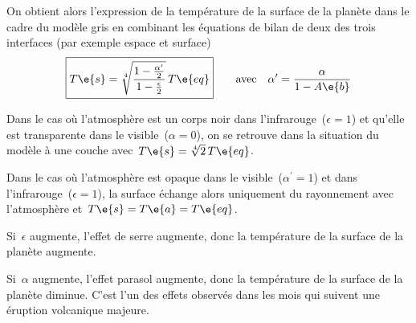 \sk
On obtient alors l'expression de la température de la surface de la planète dans le cadre du modèle gris en combinant les équations de bilan de deux des trois interfaces (par exemple espace et surface)
\[ \boxed{T\e{s} = \sqrt[4]{\frac{1 - \frac{\alpha^{\prime}}{2}}{1 - \frac{\epsilon}{2}}} \, T\e{eq}} \qquad  \text{avec} \quad \alpha^{\prime} = \frac{\alpha}{1-A\e{b}} \] 
\begin{citemize}
\item Dans le cas où l'atmosphère est un corps noir dans l'infrarouge~($\epsilon=1$) et qu'elle est transparente dans le visible~($\alpha=0$), on se retrouve dans la situation du modèle à une couche avec~$T\e{s} = \sqrt[4]{2} \, T\e{eq}$.
\item Dans le cas où l'atmosphère est opaque dans le visible~($\alpha^{\prime}=1$) et dans l'infrarouge~($\epsilon=1$), la surface échange alors uniquement du rayonnement avec l'atmosphère et~$T\e{s}=T\e{a}=T\e{eq}$.
\item Si~$\epsilon$ augmente, l'effet de serre augmente, donc la température de la surface de la planète augmente.
\item Si~$\alpha$ augmente, l'effet parasol augmente, donc la température de la surface de la planète diminue. C'est l'un des effets observés dans les mois qui suivent une éruption volcanique majeure.
\end{citemize}

